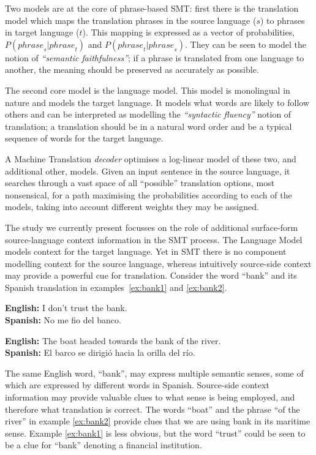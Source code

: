 \documentclass[smallextended]{svjour3}       %
\theoremstyle{break}
\begin{document}
Two models are at the core of phrase-based SMT: first there is the
translation model which maps the translation phrases in the source
language ($s$) to phrases in target language ($t$). This mapping is
expressed as a vector of probabilities, $P({phrase}_s|{phrase}_t)$ and
$P({phrase}_t|{phrase}_s)$. They can be seen to model the notion of
\emph{``semantic faithfulness''}; if a phrase is translated from one language
to another, the meaning should be preserved as accurately as possible.

The second core model is the language model. This model is monolingual
in nature and models the target language. It models what words are
likely to follow others and can be interpreted as modelling the
\emph{``syntactic fluency''} notion of translation; a translation should be
in a natural word order and be a typical sequence of words for the
target language.

A Machine Translation \emph{decoder} optimises a log-linear model of
these two, and additional other, models. Given an input sentence in
the source language, it searches through a vast space of all
``possible'' translation options, most nonsensical, for a path
maximising the probabilities according to each of the models, taking
into account different weights they may be assigned.

The study we currently present focusses on the role of additional
surface-form source-language context
information in the SMT process. The Language Model models context
for the target language. Yet in SMT there is no component modelling
context for the source language, whereas intuitively source-side context may
provide a powerful cue for translation. Consider the word ``bank'' and its
Spanish translation in examples~\ref{ex:bank1} and \ref{ex:bank2}.

\begin{exe} %
\ex \textbf{English:} I don't trust the bank. \\
    \textbf{Spanish:} No me fio del banco.
\label{ex:bank1}

\ex \textbf{English:} The boat headed towards the bank of the river. \\
    \textbf{Spanish:} El barco se dirigió hacia la orilla del río.
\label{ex:bank2}
\end{exe}

The same English word, ``bank'', may express multiple semantic senses, some of
which are expressed by different words in Spanish. Source-side context
information may provide valuable clues to what sense is being employed, and
therefore what translation is correct.  The words ``boat'' and the phrase ``of
the river'' in example \ref{ex:bank2} provide clues that we are using
bank in its maritime sense. Example \ref{ex:bank1} is less obvious, but the
word ``trust'' could be seen to be a clue for ``bank'' denoting a
financial institution.
\end{document}
